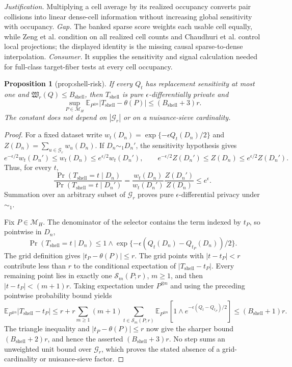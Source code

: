 \documentclass{article}
\newtheorem{proposition}{Proposition}
\begin{document}
\par\smallskip\noindent \textit{Justification.} Multiplying a cell average by its realized occupancy converts pair collisions into linear dense-cell information without increasing global sensitivity with occupancy. \textit{Gap.} The banked sparse score weights each usable cell equally, while Zeng et al. condition on all realized cell counts and Chaudhuri et al. control local projections; the displayed identity is the missing causal sparse-to-dense interpolation. \textit{Consumer.} It supplies the sensitivity and signal calculation needed for full-class target-fiber tests at every cell occupancy.

\begin{proposition}[prop:shell-risk]\label{prop:shell-risk}
If every \(Q_t\) has replacement sensitivity at most one and \(\mathfrak W_r(Q)\le B_{\mathrm{shell}}\), then \(T_{\mathrm{shell}}\) is pure \(\epsilon\)-differentially private and \[\sup_{P\in\mathcal M_H}\mathbb E_{P^{\otimes n}}|T_{\mathrm{shell}}-\theta(P)|\le(B_{\mathrm{shell}}+3)r.\] The constant does not depend on \(|\mathcal G_r|\) or on a nuisance-sieve cardinality.
\end{proposition}
\begin{proof}
For a fixed dataset write
\(w_t(D_n)=\exp\{-\epsilon Q_t(D_n)/2\}\) and
\(Z(D_n)=\sum_{u\in\mathcal G_r}w_u(D_n)\).  If \(D_n\sim_1D_n'\), the
sensitivity hypothesis gives
\[
 e^{-\epsilon/2}w_t(D_n')\le w_t(D_n)\le e^{\epsilon/2}w_t(D_n'),
 \qquad
 e^{-\epsilon/2}Z(D_n')\le Z(D_n)\le e^{\epsilon/2}Z(D_n').
\]
Thus, for every \(t\),
\[
 \frac{\Pr(T_{\mathrm{shell}}=t\mid D_n)}
 {\Pr(T_{\mathrm{shell}}=t\mid D_n')}
 =\frac{w_t(D_n)}{w_t(D_n')}\frac{Z(D_n')}{Z(D_n)}\le e^\epsilon.
\]
Summation over an arbitrary subset of \(\mathcal G_r\) proves pure
\(\epsilon\)-differential privacy under \(\sim_1\).

Fix \(P\in\mathcal M_H\).  The denominator of the selector contains the
term indexed by \(t_P\), so pointwise in \(D_n\),
\[
 \Pr(T_{\mathrm{shell}}=t\mid D_n)
 \le 1\wedge\exp\{-\epsilon(Q_t(D_n)-Q_{t_P}(D_n))/2\}.
\]
The grid definition gives \(|t_P-\theta(P)|\le r\).  The grid points with
\(|t-t_P|<r\) contribute less than \(r\) to the conditional expectation of
\(|T_{\mathrm{shell}}-t_P|\).  Every remaining point lies in exactly one
\(\mathcal S_m(P;r)\), \(m\ge1\), and then
\(|t-t_P|<(m+1)r\).  Taking expectation under \(P^{\otimes n}\) and using
the preceding pointwise probability bound yields
\[
 \mathbb E_{P^{\otimes n}}|T_{\mathrm{shell}}-t_P|
 \le r+r\sum_{m\ge1}(m+1)\sum_{t\in\mathcal S_m(P;r)}
 \mathbb E_{P^{\otimes n}}\!\left[1\wedge
 e^{-\epsilon(Q_t-Q_{t_P})/2}\right]
 \le (B_{\mathrm{shell}}+1)r.
\]
The triangle inequality and \(|t_P-\theta(P)|\le r\) now give the sharper
bound \((B_{\mathrm{shell}}+2)r\), and hence the asserted
\((B_{\mathrm{shell}}+3)r\).  No step sums an unweighted unit bound over
\(\mathcal G_r\), which proves the stated absence of a grid-cardinality or
nuisance-sieve factor.
\end{proof}
\end{document}

